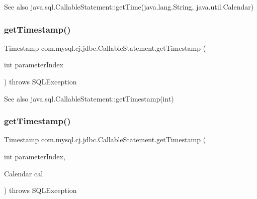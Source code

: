 \begin{DoxySeeAlso}{See also}
java.\+sql.\+Callable\+Statement\+::get\+Time(java.\+lang.\+String, java.\+util.\+Calendar) 
\end{DoxySeeAlso}
\mbox{\label{classcom_1_1mysql_1_1cj_1_1jdbc_1_1_callable_statement_a106f01266c7bfbaa1c14e3a5a3be0d2b}} 
\subsubsection{\texorpdfstring{get\+Timestamp()}{getTimestamp()}\hspace{0.1cm}{\footnotesize\ttfamily [1/4]}}
{\footnotesize\ttfamily Timestamp com.\+mysql.\+cj.\+jdbc.\+Callable\+Statement.\+get\+Timestamp (\begin{DoxyParamCaption}\item[{int}]{parameter\+Index }\end{DoxyParamCaption}) throws S\+Q\+L\+Exception}

\begin{DoxySeeAlso}{See also}
java.\+sql.\+Callable\+Statement\+::get\+Timestamp(int) 
\end{DoxySeeAlso}
\mbox{\label{classcom_1_1mysql_1_1cj_1_1jdbc_1_1_callable_statement_a95a1e742a567a1dfe798b172770acfe3}} 
\subsubsection{\texorpdfstring{get\+Timestamp()}{getTimestamp()}\hspace{0.1cm}{\footnotesize\ttfamily [2/4]}}
{\footnotesize\ttfamily Timestamp com.\+mysql.\+cj.\+jdbc.\+Callable\+Statement.\+get\+Timestamp (\begin{DoxyParamCaption}\item[{int}]{parameter\+Index,  }\item[{Calendar}]{cal }\end{DoxyParamCaption}) throws S\+Q\+L\+Exception}

